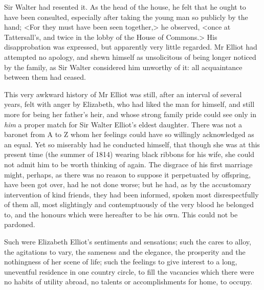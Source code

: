 Sir Walter had resented it. As the head of the house, he felt that he ought to have been consulted, especially after taking the young man so publicly by the hand; <For they must have been seen together,> he observed, <once at Tattersall's, and twice in the lobby of the House of Commons.> His disapprobation was expressed, but apparently very little regarded. Mr Elliot had attempted no apology, and shewn himself as unsolicitous of being longer noticed by the family, as Sir Walter considered him unworthy of it: all acquaintance between them had ceased.

This very awkward history of Mr Elliot was still, after an interval of several years, felt with anger by Elizabeth, who had liked the man for himself, and still more for being her father's heir, and whose strong family pride could see only in \textit{him} a proper match for Sir Walter Elliot's eldest daughter. There was not a baronet from A to Z whom her feelings could have so willingly acknowledged as an equal. Yet so miserably had he conducted himself, that though she was at this present time (the summer of 1814) wearing black ribbons for his wife, she could not admit him to be worth thinking of again. The disgrace of his first marriage might, perhaps, as there was no reason to suppose it perpetuated by offspring, have been got over, had he not done worse; but he had, as by the accustomary intervention of kind friends, they had been informed, spoken most disrespectfully of them all, most slightingly and contemptuously of the very blood he belonged to, and the honours which were hereafter to be his own. This could not be pardoned.

Such were Elizabeth Elliot's sentiments and sensations; such the cares to alloy, the agitations to vary, the sameness and the elegance, the prosperity and the nothingness of her scene of life; such the feelings to give interest to a long, uneventful residence in one country circle, to fill the vacancies which there were no habits of utility abroad, no talents or accomplishments for home, to occupy.

